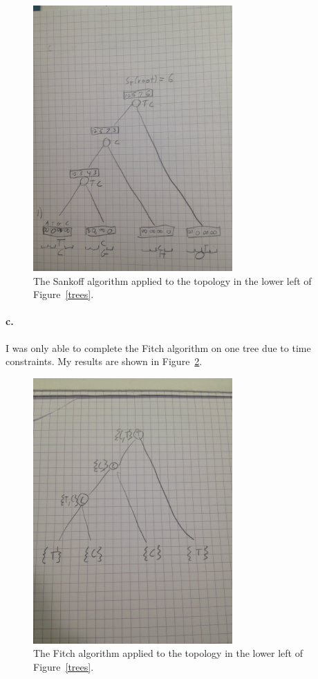 \documentclass[12pt]{article}
\begin{document}
\begin{figure}[htb]
	\begin{center}
		\includegraphics[width=3in, angle=-90]{sankoff.jpg}
	\end{center}
	\caption{The Sankoff algorithm applied to the topology in the lower left of Figure~\ref{trees}.}
	\label{sankoff}
\end{figure}

\paragraph{c.}

I was only able to complete the Fitch algorithm on one tree due to time constraints.  My results are shown in Figure~\ref{fitch}.

\begin{figure}[htb]
	\begin{center}
		\includegraphics[width=3in, angle=-90]{fitch.jpg}
	\end{center}
	\caption{The Fitch algorithm applied to the topology in the lower left of Figure~\ref{trees}.}
	\label{fitch}
\end{figure}
\end{document}
